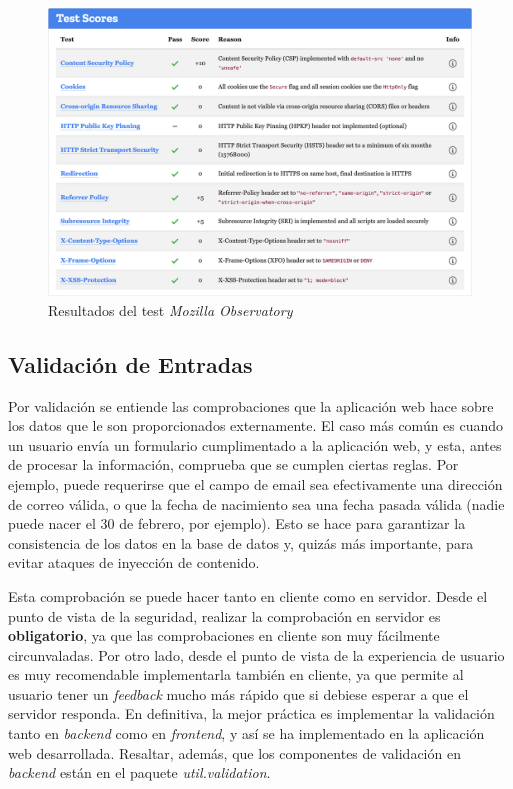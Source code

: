 \documentclass[a4paper]{article}
\begin{document}
	\begin{figure}[hbt!]
		\centering
		\includegraphics[width=\textwidth,keepaspectratio]{moz_scan_results}
		\caption{Resultados del test \emph{Mozilla Observatory}}
		\label{fig:moz_scan_results}
	\end{figure}
	
	\subsection{Validación de Entradas}
	Por validación se entiende las comprobaciones que la aplicación web hace sobre los datos que le son proporcionados externamente. El caso más común es cuando un usuario envía un formulario cumplimentado a la aplicación web, y esta, antes de procesar la información, comprueba que se cumplen ciertas reglas. Por ejemplo, puede requerirse que el campo de email sea efectivamente una dirección de correo válida, o que la fecha de nacimiento sea una fecha pasada válida (nadie puede nacer el 30 de febrero, por ejemplo). Esto se hace para garantizar la consistencia de los datos en la base de datos y, quizás más importante, para evitar ataques de inyección de contenido.
	
	Esta comprobación se puede hacer tanto en cliente como en servidor. Desde el punto de vista de la seguridad, realizar la comprobación en servidor es \textbf{obligatorio}, ya que las comprobaciones en cliente son muy fácilmente circunvaladas. Por otro lado, desde el punto de vista de la experiencia de usuario es muy recomendable implementarla también en cliente, ya que permite al usuario tener un \emph{feedback} mucho más rápido que si debiese esperar a que el servidor responda. En definitiva, la mejor práctica es implementar la validación tanto en \emph{backend} como en \emph{frontend}, y así se ha implementado en la aplicación web desarrollada. Resaltar, además, que los componentes de validación en \emph{backend} están en el paquete \emph{util.validation}.
	
\end{document}
